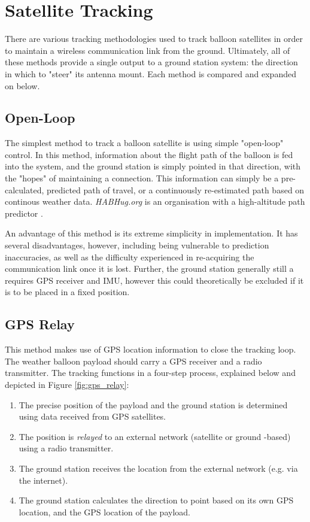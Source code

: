 \graphicspath{{./figures/}}

\section{Satellite Tracking}

There are various tracking methodologies used to track balloon satellites in order to maintain a wireless communication link from the ground. Ultimately, all of these methods provide a single output to a ground station system: the direction in which to "steer" its antenna mount. Each method is compared and expanded on below.

\subsection{Open-Loop}
The simplest method to track a balloon satellite is using simple "open-loop" control. In this method, information about the flight path of the balloon is fed into the system, and the ground station is simply pointed in that direction, with the "hopes" of maintaining a connection. This information can simply be a pre-calculated, predicted path of travel, or a continuously re-estimated path based on continous weather data. \textit{HABHug.org} is an organisation with a high-altitude path predictor \cite{site-stratoballooningPredictionTracking}.

An advantage of this method is its extreme simplicity in implementation. It has several disadvantages, however, including being vulnerable to prediction inaccuracies, as well as the difficulty experienced in re-acquiring the communication link once it is lost. Further, the ground station generally still a requires GPS receiver and IMU, however this could theoretically be excluded if it is to be placed in a fixed position.


\subsection{GPS Relay}
This method makes use of GPS location information to close the tracking loop. The weather balloon payload should carry a GPS receiver and a radio transmitter. The tracking functions in a four-step process, explained below and depicted in Figure \ref{fig:gps_relay}:
\begin{enumerate}
    \item The precise position of the payload and the ground station is determined using data received from GPS satellites.
    \item The position is \textit{relayed} to an external network (satellite or ground -based) using a radio transmitter.
    \item The ground station receives the location from the external network (e.g. via the internet).
    \item The ground station calculates the direction to point based on its own GPS location, and the GPS location of the payload.
\end{enumerate}

